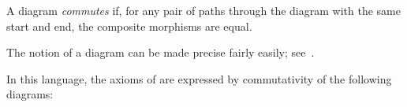 \begin{dfn}\label{def:commutative diagram}
  A diagram \emph{commutes} if, for any pair of paths through the
  diagram with the same start and end, the composite morphisms are equal.
\end{dfn}

\noindent
The notion of a diagram can be made precise fairly easily; see~\cite[Section 1.6]{riehl-2017}.

\begin{ex}
In this language, the axioms of  are expressed by commutativity of the
following diagrams:
\begin{figure}[H]
  \centering
\end{figure}
\end{ex}
